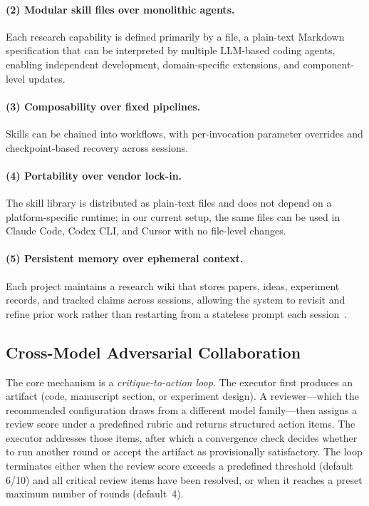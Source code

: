 \paragraph{(2) Modular skill files over monolithic agents.}
Each research capability is defined primarily by a \skillmd{} file, a plain-text Markdown specification that can be interpreted by multiple LLM-based coding agents, enabling independent development, domain-specific extensions, and component-level updates.

\paragraph{(3) Composability over fixed pipelines.}
Skills can be chained into workflows, with per-invocation parameter overrides and checkpoint-based recovery across sessions.

\paragraph{(4) Portability over vendor lock-in.}
The skill library is distributed as plain-text files and does not depend on a platform-specific runtime; in our current setup, the same \skillmd{} files can be used in Claude Code, Codex CLI, and Cursor with no file-level changes.

\paragraph{(5) Persistent memory over ephemeral context.}
Each project maintains a research wiki that stores papers, ideas, experiment records, and tracked claims across sessions, allowing the system to revisit and refine prior work rather than restarting from a stateless prompt each session~\citep{karpathy2026wiki}.

\subsection{Cross-Model Adversarial Collaboration}
\label{sec:adversarial}

The core mechanism is a \emph{critique-to-action loop}.
The executor first produces an artifact (code, manuscript section, or experiment design).
A reviewer---which the recommended configuration draws from a different model family---then assigns a review score under a predefined rubric and returns structured action items.
The executor addresses those items, after which a convergence check decides whether to run another round or accept the artifact as provisionally satisfactory.
The loop terminates either when the review score exceeds a predefined threshold (default 6/10) and all critical review items have been resolved, or when it reaches a preset maximum number of rounds (default~4).

